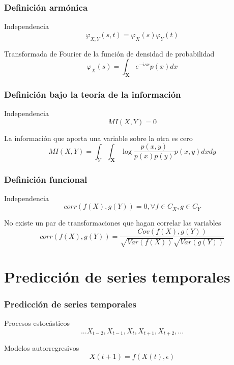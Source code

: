 \documentclass[t,9pt,pdftex]{beamer}
\begin{document}
\begin{frame}[c]
	\frametitle{Definici\'on arm\'onica}
	\begin{block}{Independencia}
		$$\varphi_{X,Y}(s,t) = \varphi_X(s)\varphi_Y(t)$$
	\end{block}
	
	\begin{exampleblock}{Transformada de Fourier de la funci\'on de densidad de probabilidad}
		$$\varphi_X(s) = \int_{\textbf{X}}{e^{-i s x} p(x)dx} $$
	\end{exampleblock}
\end{frame}



\begin{frame}[c]
	\frametitle{Definici\'on bajo la teor\'ia de la informaci\'on}
	\begin{block}{Independencia}
		$$MI(X,Y)=0$$
	\end{block}
	
	\begin{exampleblock}{La informaci\'on que aporta una variable sobre la otra es cero}
		$$MI(X,Y) = \int_{Y}{\int_{\textbf{X}}{ \log{ \frac{p(x,y)}{p(x) p(y)}}p(x,y) dx} dy} $$
	\end{exampleblock}
\end{frame}


\begin{frame}[c]
	\frametitle{Definici\'on funcional}
	\begin{block}{Independencia}
		$$corr(f(X), g(Y))=0, \mbox{} \forall f \in C_X, \mbox{} g \in C_Y$$
	\end{block}
	
	\begin{exampleblock}{No existe un par de transformaciones que hagan correlar las variables}
		$$corr(f(X), g(Y)) = \frac {Cov(f(X), g(Y))}{\sqrt{Var(f(X))} \sqrt{Var(g(Y))}} $$
	\end{exampleblock}
\end{frame}


\section{Predicci\'on de series temporales}

\begin{frame}[c]
	\frametitle{Predicci\'on de series temporales}
	\begin{block}{Procesos estoc\'asticos}
		$$... X_{t-2}, X_{t-1}, X_{t}, X_{t+1}, X_{t+2}, ...$$
	\end{block}
	
	\begin{exampleblock}{Modelos autorregresivos}
		$$X(t+1)=f(X(t), \epsilon)$$
	\end{exampleblock}
\end{frame}
\end{document}
